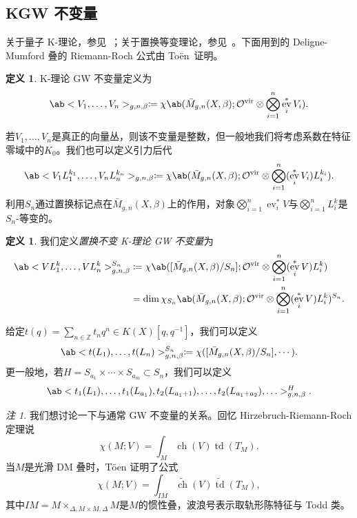 \documentclass{amsart}
\theoremstyle{definition}
\newtheorem{defn}[thm]{定义}
\theoremstyle{remark}
\newtheorem{rmk}[thm]{注}
\theoremstyle{plain}
\theoremstyle{definition}
\theoremstyle{remark}
\newcommand{\Z}{\mathbb{Z}}
\newcommand{\mc}[1]{\mathcal{#1}}
\newcommand{\mr}[1]{\mathrm{#1}}
\newcommand{\on}[1]{\operatorname{#1}}
\newcommand{\wt}[1]{\widetilde{#1}}
\newcommand{\1}{\mathbf{1}}
\newcommand{\2}{\mathbf{2}}
\newcommand{\3}{\mathbf{3}}
\newcommand{\vir}{\mr{vir}}
\DeclareMathOperator{\ev}{ev}
\begin{document}
\subsection{KGW 不变量}%
\label{sub:KGW invariants}

关于量子 K-理论，参见~\cite{Lee2004}；关于置换等变理论，参见~\cite{Givental2017K1,GiventalK7}。下面用到的 Deligne-Mumford 叠的 Riemann-Roch 公式由 To\"en~\cite{Toen1999}证明。

\begin{defn}
    K-理论 GW 不变量定义为
    \[ \ab<V_1, \ldots, V_n>_{g,n,\beta} \coloneqq \chi\ab(\bar{M}_{g,n}(X, \beta); \mc{O}^{\vir} \otimes \bigotimes_{i=1}^n \ev_i^* V_i). \]
\end{defn}

若\(V_1, \ldots, V_n\)是真正的向量丛，则该不变量是整数，但一般地我们将考虑系数在特征零域中的\(K_0\)。我们也可以定义引力后代
\[ \ab<V_1 L_1^{k_1}, \ldots, V_n L_n^{k_n}>_{g,n,\beta} \coloneqq \chi\ab(\bar{M}_{g,n}(X, \beta); \mc{O}^{\vir} \otimes \bigotimes_{i=1}^n ( \ev_i^* V_i )L_i^{k_i} ). \]
利用\(S_n\)通过置换标记点在\(\bar{M}_{g,n}(X, \beta)\)上的作用，对象\(\bigotimes_{i=1}^n \ev_i^* V\)与\(\bigotimes_{i=1}^n L_i^k\)是\(S_n\)-等变的。

\begin{defn}
    我们定义\textit{置换不变 K-理论 GW 不变量}为
    \begin{align*}
        \ab<V L_1^k, \ldots, V L_n^k>_{g,n,\beta}^{S_n} &\coloneqq \chi\ab([ \bar{M}_{g,n}(X, \beta)/S_n ]; \mc{O}^{\vir} \otimes \bigotimes_{i=1}^n ( \ev_i^* V ) L_i^k) \\
        &= \dim \chi_{S_n} \ab(\bar{M}_{g,n}(X, \beta); \mc{O}^{\vir} \otimes \bigotimes_{i=1}^n ( \ev_i^* V ) L_i^k )^{S_n}.
    \end{align*}
\end{defn}

给定\(t(q) = \sum_{n \in \Z} t_n q^n \in K(X)[q,q^{-1}]\)，我们可以定义
\[ \ab< t(L_1), \ldots, t(L_n)>^{S_n}_{g,n,\beta} \coloneqq \chi ([\bar{M}_{g,n}(X,\beta)/S_n], \cdots). \]
更一般地，若\(H = S_{a_1} \times \cdots \times S_{a_m} \subset S_n\)，我们可以定义
\[ \ab<t_1(L_1), \ldots, t_1(L_{a_1}), t_2(L_{a_1+1}), \ldots, t_2(L_{a_1+a_2}), \ldots>_{g,n,\beta}^H. \]

\begin{rmk}
    我们想讨论一下与通常 GW 不变量的关系。回忆 Hirzebruch-Riemann-Roch 定理说
    \[ \chi(M; V) = \int_M \on{ch}(V) \on{td}(T_M). \]
    当\(M\)是光滑 DM 叠时，T\"oen 证明了公式
    \[ \chi(M; V) = \int_{IM} \wt{\on{ch}}(V) \wt{\on{td}}(T_M), \]
    其中\(IM = M \times_{\Delta, M \times M, \Delta} M\)是\(M\)的惯性叠，波浪号表示取轨形陈特征与 Todd 类。
\end{rmk}
\end{document}
